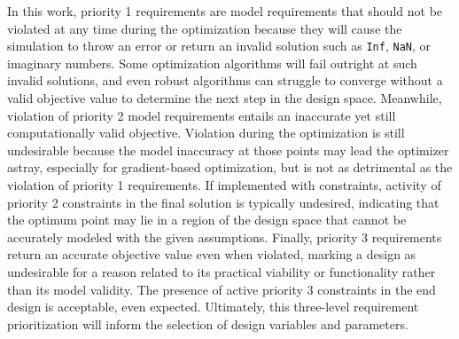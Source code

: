 \begin{longtable}
    \caption{Requirements}
    \label{tab:requirements}
\end{longtable}

In this work, priority 1 requirements are model requirements that should not be violated at any time during the optimization because they will cause the simulation to throw an error or return an invalid solution such as \texttt{Inf}, \texttt{NaN}, or imaginary numbers.
Some optimization algorithms will fail outright at such invalid solutions, and even robust algorithms can struggle to converge without a valid objective value to determine the next step in the design space.
Meanwhile, violation of priority 2 model requirements entails an inaccurate yet still computationally valid objective.
Violation during the optimization is still undesirable because the model inaccuracy at those points may lead the optimizer astray, especially for gradient-based optimization, but is not as detrimental as the violation of priority 1 requirements.
If implemented with constraints, activity of priority 2 constraints in the final solution is typically undesired, indicating that the optimum point may lie in a region of the design space that cannot be accurately modeled with the given assumptions.
Finally, priority 3 requirements return an accurate objective value even when violated, marking a design as undesirable for a reason related to its practical viability or functionality rather than its model validity.
The presence of active priority 3 constraints in the end design is acceptable, even expected.
Ultimately, this three-level requirement prioritization will inform the selection of design variables and parameters.

